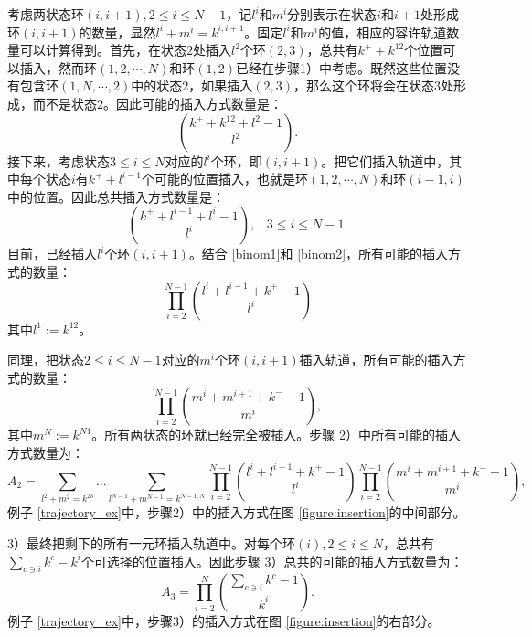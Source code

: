 考虑两状态环$(i, i+1), 2\leqslant i \leqslant N-1$，记$l^i$和$m^i$分别表示在状态$i$和$i+1$处形成环$(i, i+1)$的数量，显然$l^i + m^i = k^{i, i+1}$。固定$l^i$和$m^i$的值，相应的容许轨道数量可以计算得到。首先，在状态$2$处插入$l^2$个环$(2, 3)$，总共有$k^+ + k^{12}$个位置可以插入，然而环$(1,2, \cdots, N)$和环$(1, 2)$已经在步骤1）中考虑。既然这些位置没有包含环$(1, N, \cdots, 2)$中的状态$2$，如果插入$(2,3)$，那么这个环将会在状态$3$处形成，而不是状态$2$。因此可能的插入方式数量是：
\begin{equation} \label{binom1}
    \binom{k^++k^{12}+l^{2}-1}{l^{2}}.
\end{equation}
接下来，考虑状态$3 \leqslant i \leqslant N$对应的$l^i$个环，即$(i, i+1)$。把它们插入轨道中，其中每个状态$i$有$k^+ + l^{i-1}$个可能的位置插入，也就是环$(1, 2, \cdots, N)$和环$(i-1, i)$中的位置。因此总共插入方式数量是：
\begin{equation} \label{binom2}
    \binom{k^++l^{i-1}+l^{i}-1}{l^{i}},\;\;\;3\le i\le N-1.
\end{equation}
目前，已经插入$l^i$个环$(i,i+1)$。结合 \ref{binom1}和 \ref{binom2}，所有可能的插入方式的数量：
\begin{equation*}
    \prod_{i=2}^{N-1}\binom{l^{i}+l^{i-1}+k^{+}-1}{l^{i}}
\end{equation*}
其中$l^1:=k^{12}$。

同理，把状态$2 \leqslant i \leqslant N-1$对应的$m^i$个环$(i, i+1)$插入轨道，所有可能的插入方式的数量：
\begin{equation*}
    \prod_{i=2}^{N-1}\binom{m^{i}+m^{i+1}+k^{-}-1}{m^{i}},
\end{equation*}
其中$m^N:=k^{N1}$。所有两状态的环就已经完全被插入。步骤 2）中所有可能的插入方式数量为：
\begin{equation*}
    A_2 = \sum_{l^{2}+m^{2}=k^{23}}\dots\sum_{l^{N-1}+m^{N-1}=k^{N-1,N}}
    \prod_{i=2}^{N-1}\binom{l^{i}+l^{i-1}+k^{+}-1}{l^{i}}\prod_{i=2}^{N-1}\binom{m^{i}+m^{i+1}+k^{-}-1}{m^{i}},
\end{equation*}
例子 \ref{trajectory_ex}中，步骤2）中的插入方式在图 \ref{figure:insertion}的中间部分。

3）最终把剩下的所有一元环插入轨道中。对每个环$(i), 2 \leqslant i \leqslant N$，总共有$\sum_{c\ni i}k^c-k^i$个可选择的位置插入。因此步骤 3）总共的可能的插入方式数量为：
\begin{equation*}\label{formula:A3}
    A_3 = \prod_{i=2}^N\binom{\sum_{c\ni i}k^{c}-1}{k^{i}}.
\end{equation*}
例子 \ref{trajectory_ex}中，步骤3）的插入方式在图 \ref{figure:insertion}的右部分。

